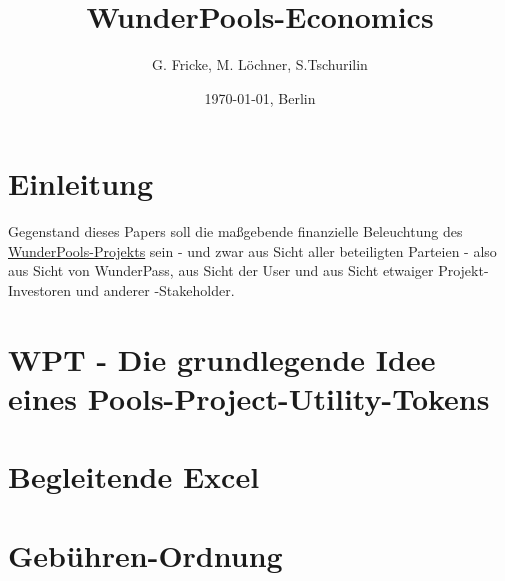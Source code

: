 \documentclass[11pt]{scrartcl}
\title{WunderPools-Economics}
\author{G. Fricke, M. Löchner, S.Tschurilin}
\date{\today{}, Berlin}
\begin{document}
\maketitle
\tableofcontents{}

\newpage




\section{Einleitung}
\vspace{0.2cm}

Gegenstand dieses Papers soll die maßgebende finanzielle Beleuchtung des \href{https://github.com/WunderPass/White-Paper/blob/main/pools.pdf}{WunderPools-Projekts} sein - und zwar aus Sicht aller beteiligten Parteien - also aus Sicht von WunderPass, aus Sicht der User und aus Sicht etwaiger Projekt-Investoren und anderer -Stakeholder.

\vspace{0.1cm}

\vspace{0.5cm}

\section{WPT - Die grundlegende Idee eines Pools-Project-Utility-Tokens}
\label{sec:wpt-design}
\vspace{0.2cm}
%
\vspace{0.5cm}

\section{Begleitende Excel}
\label{sec:excel}
\vspace{0.2cm}
\vspace{0.5cm}

\section{Gebühren-Ordnung}
\label{sec:fees}
\vspace{0.2cm}

\vspace{0.5cm}
\end{document}
